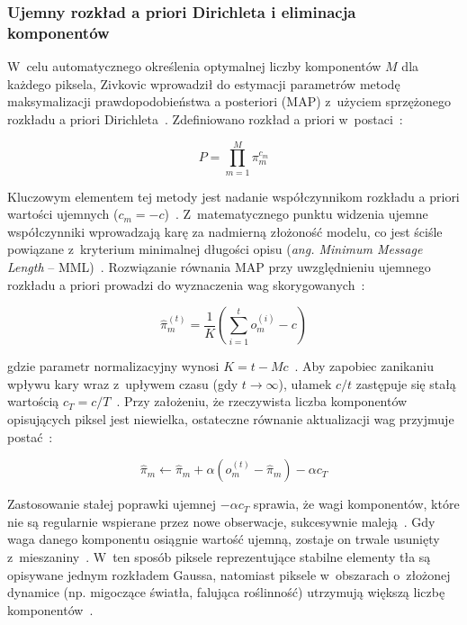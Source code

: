 \subsubsection{Ujemny rozkład a priori Dirichleta i eliminacja komponentów}

W~celu automatycznego określenia optymalnej liczby komponentów $M$ dla każdego piksela, Zivkovic
wprowadził do estymacji parametrów metodę maksymalizacji prawdopodobieństwa a posteriori (MAP)
z~użyciem sprzężonego rozkładu a priori Dirichleta~\cite{zivkovic2004, zivkovic2006}. Zdefiniowano
rozkład a priori w~postaci~\cite{zivkovic2004}:

\begin{equation}
  P = \prod_{m=1}^M \pi_m^{c_m}
  \label{eq:dirichlet_prior}
\end{equation}

Kluczowym elementem tej metody jest nadanie współczynnikom rozkładu a priori wartości ujemnych
($c_m = -c$)~\cite{zivkovic2004}. Z~matematycznego punktu widzenia ujemne współczynniki wprowadzają
karę za nadmierną złożoność modelu, co jest ściśle powiązane z~kryterium minimalnej długości opisu
(\textit{ang. Minimum Message Length} -- MML)~\cite{zivkovic2004}. Rozwiązanie równania MAP przy
uwzględnieniu ujemnego rozkładu a priori prowadzi do wyznaczenia wag
skorygowanych~\cite{zivkovic2004}:

\begin{equation}
  \hat{\pi}_m^{(t)} = \frac{1}{K} \left( \sum_{i=1}^t o_m^{(i)} - c \right)
  \label{eq:map_weights}
\end{equation}

gdzie parametr normalizacyjny wynosi $K = t - Mc$~\cite{zivkovic2004}. Aby zapobiec zanikaniu
wpływu kary wraz z~upływem czasu (gdy $t \to \infty$), ułamek $c/t$ zastępuje się stałą wartością
$c_T = c/T$~\cite{zivkovic2004}. Przy założeniu, że rzeczywista liczba komponentów opisujących
piksel jest niewielka, ostateczne równanie aktualizacji wag przyjmuje postać~\cite{zivkovic2004}:

\begin{equation}
  \hat{\pi}_m \leftarrow \hat{\pi}_m + \alpha (o_m^{(t)} - \hat{\pi}_m) - \alpha c_T
  \label{eq:mog2_final_weight_update}
\end{equation}

Zastosowanie stałej poprawki ujemnej $-\alpha c_T$ sprawia, że wagi komponentów, które nie są
regularnie wspierane przez nowe obserwacje, sukcesywnie maleją~\cite{zivkovic2004}. Gdy waga danego
komponentu osiągnie wartość ujemną, zostaje on trwale usunięty z~mieszaniny~\cite{zivkovic2004}.
W~ten sposób piksele reprezentujące stabilne elementy tła są opisywane jednym rozkładem Gaussa,
natomiast piksele w~obszarach o~złożonej dynamice (np. migoczące światła, falująca roślinność)
utrzymują większą liczbę komponentów~\cite{zivkovic2004, zivkovic2006}.

